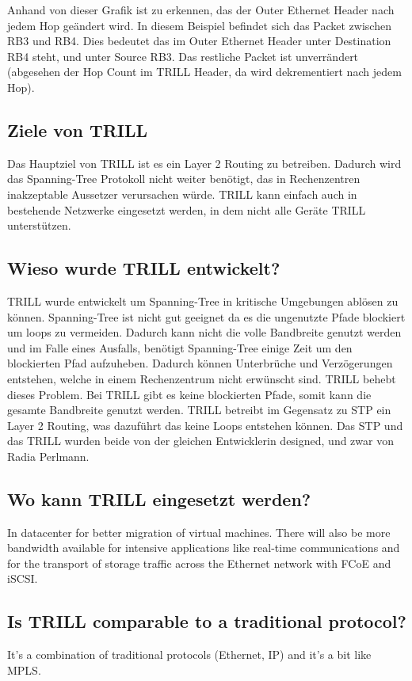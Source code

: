 \documentclass[a4,12pt]{scrartcl}
\begin{document}
\noindent Anhand von dieser Grafik ist zu erkennen, das der Outer Ethernet Header nach jedem Hop geändert wird. In diesem Beispiel befindet sich das Packet zwischen RB3 und RB4. Dies bedeutet das im Outer Ethernet Header unter Destination RB4 steht, und unter Source RB3. Das restliche Packet ist unverrändert (abgesehen der Hop Count im TRILL Header, da wird dekrementiert nach jedem Hop). 
\newpage

\subsection{Ziele von TRILL}
Das Hauptziel von TRILL ist es ein Layer 2 Routing zu betreiben. Dadurch wird das Spanning-Tree Protokoll nicht weiter benötigt, das in Rechenzentren inakzeptable Aussetzer verursachen würde. TRILL kann einfach auch in bestehende Netzwerke eingesetzt werden, in dem nicht alle Geräte TRILL unterstützen. 

\subsection{Wieso wurde TRILL entwickelt?}
TRILL wurde entwickelt um Spanning-Tree in kritische Umgebungen ablösen zu können. Spanning-Tree ist nicht gut geeignet da es die ungenutzte Pfade blockiert um loops zu vermeiden. Dadurch kann nicht die volle Bandbreite genutzt werden und im Falle eines Ausfalls, benötigt Spanning-Tree einige Zeit um den blockierten Pfad aufzuheben. Dadurch können Unterbrüche und Verzögerungen entstehen, welche in einem Rechenzentrum nicht erwünscht sind. TRILL behebt dieses Problem. Bei TRILL gibt es keine blockierten Pfade, somit kann die gesamte Bandbreite genutzt werden. TRILL betreibt im Gegensatz zu STP ein Layer 2 Routing, was dazuführt das keine Loops entstehen können. Das STP und das TRILL wurden beide von der gleichen Entwicklerin designed, und zwar von Radia Perlmann. 

\subsection{Wo kann TRILL eingesetzt werden?}
In datacenter for better migration of virtual machines. There will also be more bandwidth available for intensive applications like real-time communications and for the transport of storage traffic across the Ethernet network with FCoE and iSCSI.

\subsection{Is TRILL comparable to a traditional protocol?}It's a combination of traditional protocols (Ethernet, IP) and it's a bit like MPLS.
\end{document}
